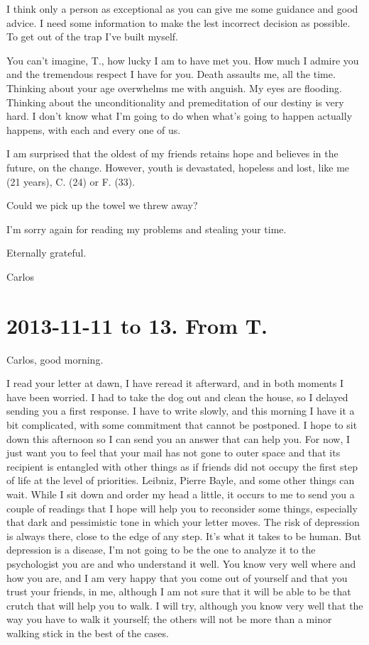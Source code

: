 \documentclass[]{book}
\begin{document}
I think only a person as exceptional as you can give me some guidance and good advice. I need some information to make the lest incorrect decision as possible. To get out of the trap I've built myself.

You can't imagine, T., how lucky I am to have met you. How much I admire you and the tremendous respect I have for you. Death assaults me, all the time. Thinking about your age overwhelms me with anguish. My eyes are flooding. Thinking about the unconditionality and premeditation of our destiny is very hard. I don't know what I'm going to do when what's going to happen actually happens, with each and every one of us.

I am surprised that the oldest of my friends retains hope and believes in the future, on the change. However, youth is devastated, hopeless and lost, like me (21 years), C. (24) or F. (33).

Could we pick up the towel we threw away?

I'm sorry again for reading my problems and stealing your time.

Eternally grateful.

Carlos

\hypertarget{fromtomas20131111}{%
\section*{2013-11-11 to 13. From T.}\label{fromtomas20131111}}

Carlos, good morning.

I read your letter at dawn, I have reread it afterward, and in both moments I have been worried. I had to take the dog out and clean the house, so I delayed sending you a first response. I have to write slowly, and this morning I have it a bit complicated, with some commitment that cannot be postponed. I hope to sit down this afternoon so I can send you an answer that can help you. For now, I just want you to feel that your mail has not gone to outer space and that its recipient is entangled with other things as if friends did not occupy the first step of life at the level of priorities. Leibniz, Pierre Bayle, and some other things can wait. While I sit down and order my head a little, it occurs to me to send you a couple of readings that I hope will help you to reconsider some things, especially that dark and pessimistic tone in which your letter moves. The risk of depression is always there, close to the edge of any step. It's what it takes to be human. But depression is a disease, I'm not going to be the one to analyze it to the psychologist you are and who understand it well. You know very well where and how you are, and I am very happy that you come out of yourself and that you trust your friends, in me, although I am not sure that it will be able to be that crutch that will help you to walk. I will try, although you know very well that the way you have to walk it yourself; the others will not be more than a minor walking stick in the best of the cases.
\end{document}
